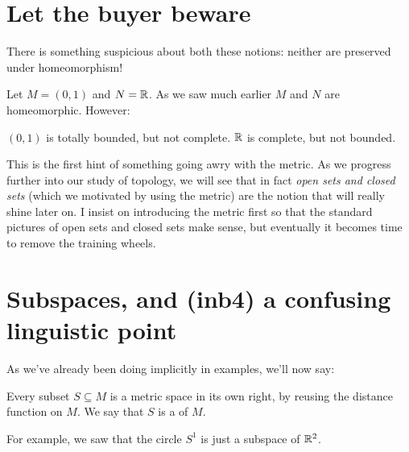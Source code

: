 \section{Let the buyer beware}
There is something suspicious about both these notions:
neither are preserved under homeomorphism!

\begin{example}
	\label{ex:fishy}
	Let $M = (0,1)$ and $N = \mathbb R$.
	As we saw much earlier $M$ and $N$ are homeomorphic.
	However:
	\begin{itemize}
		\ii $(0,1)$ is totally bounded, but not complete.
		\ii $\mathbb R$ is complete, but not bounded.
	\end{itemize}
\end{example}

This is the first hint of something going awry with the metric.
As we progress further into our study of topology,
we will see that in fact \emph{open sets and closed sets}
(which we motivated by using the metric)
are the notion that will really shine later on.
I insist on introducing the metric first so that
the standard pictures of open sets and closed sets make sense,
but eventually it becomes time to remove the training wheels.



\section{Subspaces, and (inb4) a confusing linguistic point}

As we've already been doing implicitly in examples, we'll now say:
\begin{definition}
	Every subset $S \subseteq M$ is a metric space in its own right,
	by reusing the distance function on $M$.
	We say that $S$ is a  of $M$.
\end{definition}
For example, we saw that the circle $S^1$
is just a subspace of $\mathbb R^2$.

